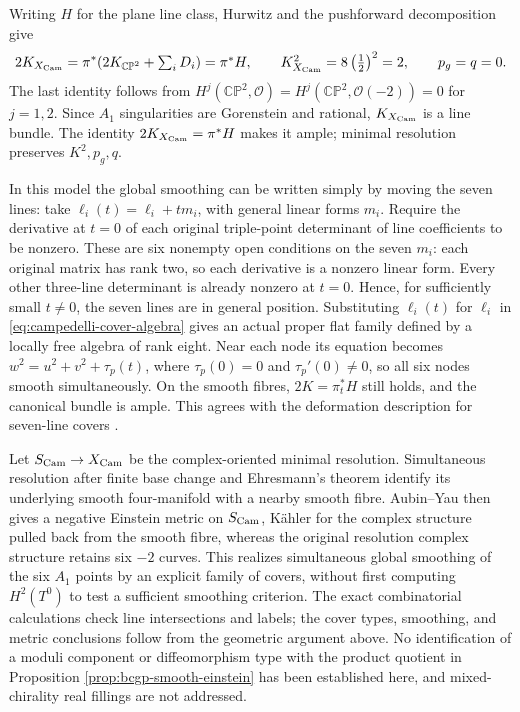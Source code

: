 \documentclass[a4paper,11pt]{article}
\numberwithin{equation}{section}
\theoremstyle{definition}
\newcommand{\CP}{\mathbb{CP}}
\begin{document}
Writing $H$ for the plane line class, Hurwitz and the pushforward decomposition give
\begin{equation}\label{eq:campedelli-invariants}
2K_{X_{\rm Cam}}=\pi^*(2K_{\CP^2}+\textstyle\sum_iD_i)=\pi^*H,
\qquad K_{X_{\rm Cam}}^2=8\left(\frac12\right)^2=2,
\qquad p_g=q=0.
\end{equation}
The last identity follows from $H^j(\CP^2,\mathcal O)=H^j(\CP^2,\mathcal O(-2))=0$ for $j=1,2$.
Since $A_1$ singularities are Gorenstein and rational, $K_{X_{\rm Cam}}$ is a line bundle.
The identity $2K_{X_{\rm Cam}}=\pi^*H$ makes it ample; minimal resolution preserves $K^2,p_g,q$.

In this model the global smoothing can be written simply by moving the seven lines:
take $\ell_i(t)=\ell_i+t m_i$, with general linear forms $m_i$.
Require the derivative at $t=0$ of each original triple-point determinant of line coefficients to be nonzero.
These are six nonempty open conditions on the seven $m_i$: each original matrix has rank two, so each derivative is a nonzero linear form.
Every other three-line determinant is already nonzero at $t=0$.
Hence, for sufficiently small $t\ne0$, the seven lines are in general position.
Substituting $\ell_i(t)$ for $\ell_i$ in \eqref{eq:campedelli-cover-algebra}
gives an actual proper flat family defined by a locally free algebra of rank eight.
Near each node its equation becomes $w^2=u^2+v^2+\tau_p(t)$,
where $\tau_p(0)=0$ and $\tau_p'(0)\ne0$, so all six nodes smooth simultaneously.
On the smooth fibres, $2K=\pi_t^*H$ still holds, and the canonical bundle is ample.
This agrees with the deformation description for seven-line covers \cite[\S3.3]{AlexeevPardini}.

Let $S_{\rm Cam}\to X_{\rm Cam}$ be the complex-oriented minimal resolution.
Simultaneous resolution after finite base change and Ehresmann's theorem identify its underlying smooth four-manifold with a nearby smooth fibre.
Aubin--Yau then gives a negative Einstein metric on $S_{\rm Cam}$,
K\"ahler for the complex structure pulled back from the smooth fibre, whereas the original resolution complex structure retains six $-2$ curves.
This realizes simultaneous global smoothing of the six $A_1$ points by an explicit family of covers,
without first computing $H^2(T^0)$ to test a sufficient smoothing criterion.
The exact combinatorial calculations check line intersections and labels; the cover types, smoothing, and metric conclusions follow from the geometric argument above.
No identification of a moduli component or diffeomorphism type with the product quotient in Proposition \ref{prop:bcgp-smooth-einstein} has been established here,
and mixed-chirality real fillings are not addressed.
\end{document}
